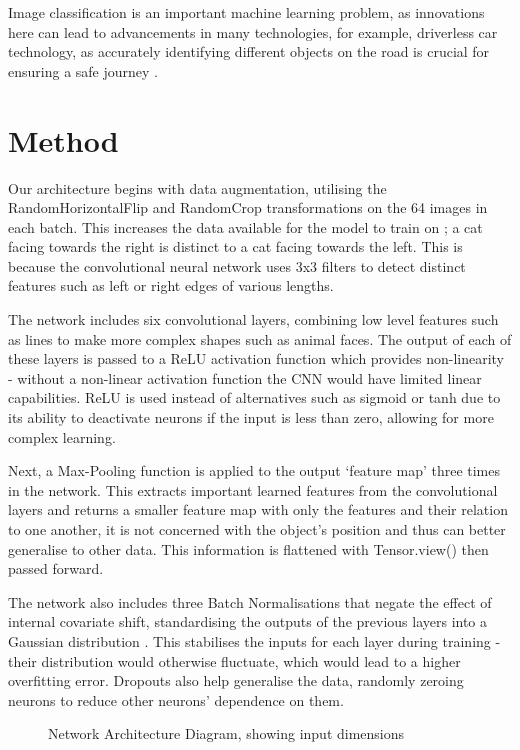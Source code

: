 \documentclass[journal]{IEEEtran}
\begin{document}
Image classification is an important machine learning problem, as innovations here can lead to advancements in many technologies, for example, driverless car technology, as accurately identifying different objects on the road is crucial for ensuring a safe journey \cite{ImageRecognitionApp}.

\section{Method}
Our architecture begins with data augmentation, utilising the RandomHorizontalFlip and RandomCrop transformations on the 64 images in each batch. This increases the data available for the model to train on \cite{dataAug}; a cat facing towards the right is distinct to a cat facing towards the left. This is because the convolutional neural network uses 3x3 filters to detect distinct features such as left or right edges of various lengths.

The network includes six convolutional layers, combining low level features such as lines to make more complex shapes such as animal faces. The output of each of these layers is passed to a ReLU activation function which provides non-linearity - without a non-linear activation function the CNN would have limited linear capabilities. ReLU is used instead of alternatives such as sigmoid or tanh due to its ability to deactivate neurons if the input is less than zero, allowing for more complex learning.

Next, a Max-Pooling function is applied to the output ‘feature map’ three times in the network. This extracts important learned features from the convolutional layers and returns a smaller feature map with only the features and their relation to one another, it is not concerned with the object's position and thus can better generalise to other data. This information is flattened with Tensor.view() then passed forward.

The network also includes three Batch Normalisations that negate the effect of internal covariate shift, standardising the outputs of the previous layers into a Gaussian distribution \cite{ioffe2015batch}. This stabilises the inputs for each layer during training - their distribution would otherwise fluctuate, which would lead to a higher overfitting error. Dropouts also help generalise the data, randomly zeroing neurons to reduce other neurons' dependence on them.

\begin{figure}[!b]
  \centering
  
  \caption{Network Architecture Diagram, showing input dimensions}
  \label{diagram}
\end{figure}
\end{document}
